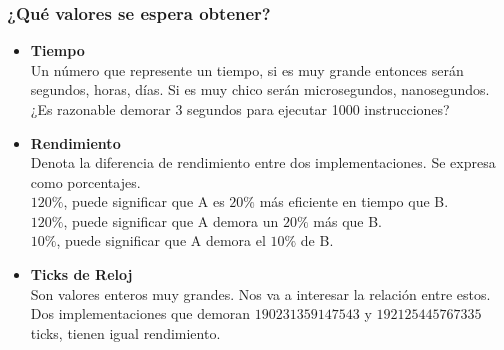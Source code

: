 \documentclass[aspectratio=169]{beamer}
\begin{document}
\begin{frame}[fragile]
    \frametitle{ \vspace{-1cm} \flushright \colorbox{verdeuca}{ \small \textcolor{white}{ \footnotesize \secname } }\\
    ¿Qué valores se espera obtener?}
    \begin{itemize}
     \item \Large \textbf{Tiempo} \normalsize \\
     Un número que represente un tiempo, si es muy grande entonces serán segundos, horas, días.
     Si es muy chico serán microsegundos, nanosegundos.\\
     \footnotesize \textcolor{black!50}{¿Es razonable demorar 3 segundos para ejecutar 1000 instrucciones?}
     \vskip 10pt \pause
     \item \Large \textbf{Rendimiento} \normalsize \\
     Denota la diferencia de rendimiento entre dos implementaciones. Se expresa como porcentajes.\\
     \footnotesize \textcolor{black!50}{$120\%$, puede significar que A es $20\%$ más eficiente en tiempo que B.}\\
     \footnotesize \textcolor{black!50}{$120\%$, puede significar que A demora un $20\%$ más que B.}\\
     \footnotesize \textcolor{black!50}{$10\%$, puede significar que A demora el $10\%$ de B.}
     \vskip 10pt \pause
     \item \Large \textbf{Ticks de Reloj} \normalsize \\
     Son valores enteros muy grandes. Nos va a interesar la relación entre estos.\\
     \footnotesize \textcolor{black!50}{Dos implementaciones que demoran $190231359147543$ y $192125445767335$ ticks, tienen igual rendimiento.}
    \end{itemize}
\end{frame}
\end{document}
